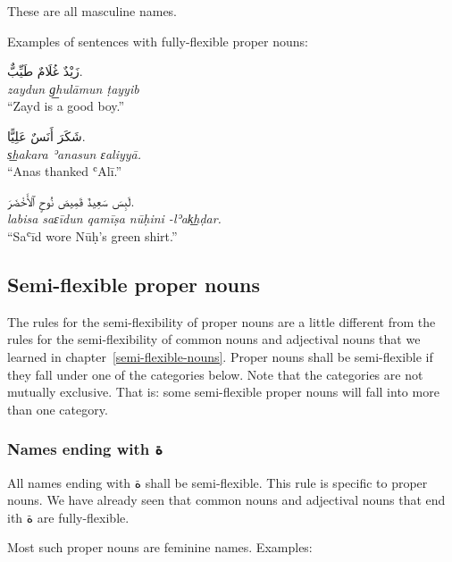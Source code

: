 \documentclass[
  10pt,
]{book}
\begin{document}
These are all masculine names.

Examples of sentences with fully-flexible proper nouns:

\foreignlanguage{arabic}{زَيْدٌ غُلَامٌ طَيِّبٌّ.}\\
\emph{zaydun g͟hulāmun ṭayyib}\\
\enquote{Zayd is a good boy.}

\foreignlanguage{arabic}{شَکَرَ أَنَسٌ عَلِيًّا.}\\
\emph{s͟hakara ʾanasun ɛaliyyā.}\\
\enquote{Anas thanked ʿAlī.}

\foreignlanguage{arabic}{لَبِسَ سَعِيدٌ قَمِيصَ نُوحٍ ٱلأَخْضَرَ.}\\
\emph{labisa saɛīdun qamīṣa nūḥini -lʾak͟hḍar.}\\
\enquote{Saʿīd wore Nūḥ's green shirt.}

\subsection{Semi-flexible proper nouns}\label{semi-flexible-proper-nouns}

The rules for the semi-flexibility of proper nouns are a little different from the rules for the semi-flexibility of common nouns and adjectival nouns that we learned in chapter~\ref{semi-flexible-nouns}.
Proper nouns shall be semi-flexible if they fall under one of the categories below. Note that the categories are not mutually exclusive. That is: some semi-flexible proper nouns will fall into more than one category.

\subsubsection{\texorpdfstring{Names ending with \foreignlanguage{arabic}{ة}}{Names ending with ة}}\label{names-ending-with-ux629}

All names ending with \foreignlanguage{arabic}{ة} shall be semi-flexible. This rule is specific to proper nouns. We have already seen that common nouns and adjectival nouns that end ith \foreignlanguage{arabic}{ة} are fully-flexible.

Most such proper nouns are feminine names. Examples:
\end{document}
